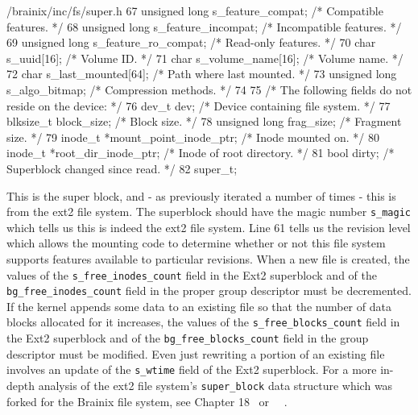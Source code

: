 \documentclass{article}
\begin{document}
\begin{code}{/brainix/inc/fs/super.h}
{67      unsigned long s_feature_compat;    /* Compatible features.            */
68      unsigned long s_feature_incompat;  /* Incompatible features.          */
69      unsigned long s_feature_ro_compat; /* Read-only features.             */
70      char s_uuid[16];                   /* Volume ID.                      */
71      char s_volume_name[16];            /* Volume name.                    */
72      char s_last_mounted[64];           /* Path where last mounted.        */
73      unsigned long s_algo_bitmap;       /* Compression methods.            */
74 
75      /* The following fields do not reside on the device: */
76      dev_t dev;                         /* Device containing file system. */
77      blksize_t block_size;              /* Block size.                    */
78      unsigned long frag_size;           /* Fragment size.                 */
79      inode_t *mount_point_inode_ptr;    /* Inode mounted on.              */
80      inode_t *root_dir_inode_ptr;       /* Inode of root directory.       */
81      bool dirty;                        /* Superblock changed since read. */
82 } super_t;
\end{code}
This is the super block, and - as previously iterated a number of times - this is from the ext2 file system. The superblock should have the magic number \verb|s_magic| which tells us this is indeed the ext2 file system. Line 61 tells us the revision level which allows the mounting code to determine whether or not this file system supports features available to particular revisions. When a new file is created, the values of the \verb|s_free_inodes_count| field in the Ext2 superblock and of the \verb|bg_free_inodes_count| field in the proper group descriptor must be decremented. If the kernel appends some data to an existing file so that the number of data blocks allocated for it increases, the values of the \verb|s_free_blocks_count| field in the Ext2 superblock and of the \verb|bg_free_blocks_count| field in the group descriptor must be modified. Even just rewriting a portion of an existing file involves an update of the \verb|s_wtime| field of the Ext2 superblock. For a more in-depth analysis of the ext2 file system's \verb|super_block| data structure which was forked for the Brainix file system, see Chapter 18~\cite{linuxbook} or \cite{3}~\cite{7}~\cite{8}.
\end{document}
